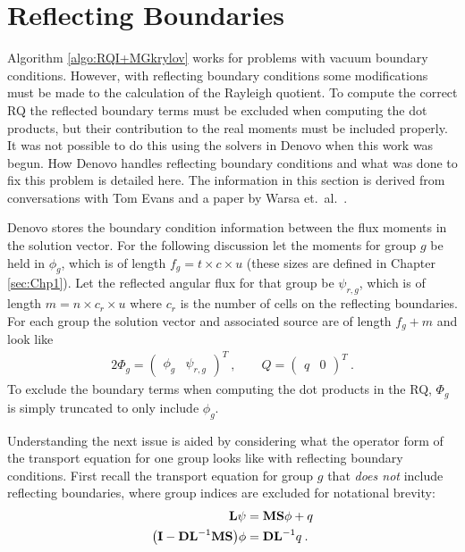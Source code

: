 
\chapter{Reflecting Boundaries}
\label{sec:AppendixC}

Algorithm \ref{algo:RQI+MGkrylov} works for problems with vacuum boundary conditions. However, with reflecting boundary conditions some modifications must be made to the calculation of the Rayleigh quotient. To compute the correct RQ the reflected boundary terms must be excluded when computing the dot products, but their contribution to the real moments must be included properly. It was not possible to do this using the solvers in Denovo when this work was begun. How Denovo handles reflecting boundary conditions and what was done to fix this problem is detailed here. The information in this section is derived from conversations with Tom Evans \cite{Evans2011a} and a paper by Warsa et.\ al.\ \cite{Warsa2004}.

Denovo stores the boundary condition information between the flux moments in the solution vector. For the following discussion let the moments for group $g$ be held in $\phi_{g}$, which is of length $f_{g} = t \times c \times u$ (these sizes are defined in Chapter \ref{sec:Chp1}). Let the reflected angular flux for that group be $\psi_{r,g}$, which is of length $m = n \times c_{r} \times u$ where $c_{r}$ is the number of cells on the reflecting boundaries. For each group the solution vector and associated source are of length $f_{g} + m$ and look like
%
\begin{alignat}{2}
 \Phi_{g} = \begin{pmatrix} \phi_{g} & \psi_{r,g} \end{pmatrix}^{T} \:, \qquad Q = \begin{pmatrix} q & 0 \end{pmatrix}^{T} \:.
\label{eq:reflFlux}
\end{alignat}
%
To exclude the boundary terms when computing the dot products in the RQ, $\Phi_{g}$ is simply truncated to only include $\phi_{g}$. 

Understanding the next issue is aided by considering what the operator form of the transport equation for one group looks like with reflecting boundary conditions. First recall the transport equation for group $g$ that \emph{does not} include reflecting boundaries, where group indices are excluded for notational brevity:
%
\begin{align}
  \mathbf{L} \psi &= \mathbf{MS}\phi + q
  \label{eq:transport} \\
  \bigl(\mathbf{I} - \mathbf{DL}^{-1}\mathbf{MS} \bigr) \phi &= \mathbf{DL}^{-1}q \:.
  \label{eq:transportMoments}
\end{align}

